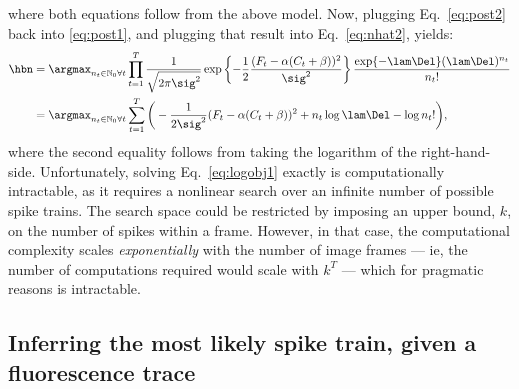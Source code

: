 where both equations follow from the above model.  Now, plugging Eq.~\eqref{eq:post2} back into \eqref{eq:post1}, and plugging that result into Eq.~\eqref{eq:nhat2}, yields:
\begin{subequations}  \label{eq:obj}
\begin{align}
\hbn 	&= \anx \prod_{t=1}^T \frac{1}{\sqrt{2 \pi \sig^2}} \exp \left\{-\frac{1}{2}\frac{(F_t - \alpha (C_t + \beta))^2}{\sig^2}\right\} \frac{\exp\{-\lam\Del\} (\lam\Del)^{n_t}}{n_t!}
\label{eq:obj1}\\ &= \anx  \sum_{t=1}^T \bigg( -\frac{1}{2 \sig^2}(F_t - \alpha(C_t + \beta))^2  +  n_t \log \lam \Del - \log n_t! \bigg), \label{eq:logobj1}
\end{align} 
\end{subequations}
\noindent where the second equality follows from taking the logarithm of the right-hand-side.  Unfortunately, solving Eq.~\eqref{eq:logobj1} exactly is computationally intractable, as it requires a nonlinear search over an infinite number of  possible spike trains.  The search space could be restricted by imposing an upper bound, $k$, on the number of spikes within a frame.  However, in that case, the computational complexity scales \emph{exponentially} with the number of image frames --- ie, the number of computations required would scale with $k^T$ --- which for pragmatic reasons is intractable.




\subsection{Inferring the most likely spike train, given a fluorescence trace} \label{sec:inf}

